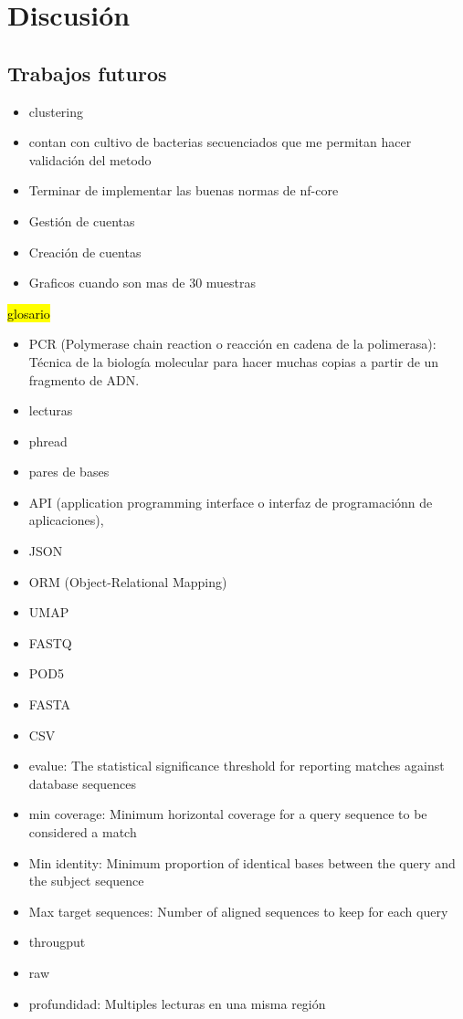 \chapter{Discusión}
\section{Trabajos futuros}
\begin{itemize}
    \item clustering
    \item contan con cultivo de bacterias secuenciados que me permitan hacer validación del metodo
    \item Terminar de implementar las buenas normas de nf-core
    \item Gestión de cuentas
    \item Creación de cuentas
    \item Graficos cuando son mas de 30 muestras
\end{itemize}
\hl{glosario}
\begin{itemize}
    \item PCR (Polymerase chain reaction o reacción en cadena de la polimerasa): Técnica de la biología molecular para hacer muchas copias a partir de un fragmento de ADN.
    \item lecturas
    \item phread
    \item pares de bases
    \item API (application programming interface o interfaz de programaciónn de aplicaciones),
    \item JSON
    \item ORM (Object-Relational Mapping)
    \item UMAP
    \item FASTQ
    \item POD5
    \item FASTA
    \item CSV
    \item evalue: The statistical significance threshold for reporting matches against database sequences
    \item min coverage: Minimum horizontal coverage for a query sequence to be considered a match
    \item Min identity: Minimum proportion of identical bases between the query and the subject sequence
    \item Max target sequences: Number of aligned sequences to keep for each query
    \item througput
    \item raw
    \item profundidad: Multiples lecturas en una misma región
\end{itemize}
